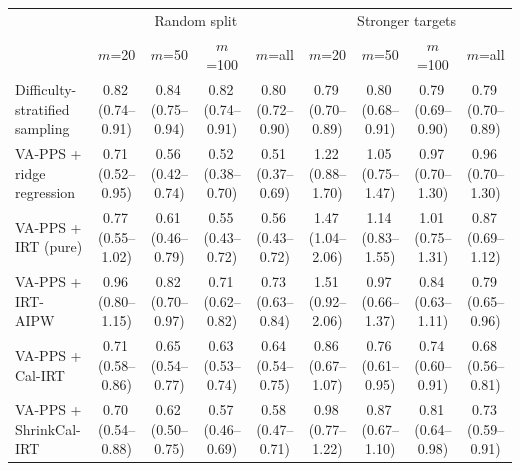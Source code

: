 \begin{tabular}{lcccccccc}
\toprule
 & \multicolumn{4}{c}{Random split} & \multicolumn{4}{c}{Stronger targets} \\
 & $m$=20 & $m$=50 & $m$=100 & $m$=all & $m$=20 & $m$=50 & $m$=100 & $m$=all \\
\midrule
Difficulty-stratified sampling & 0.82\,\scriptsize(0.74--0.91) & 0.84\,\scriptsize(0.75--0.94) & 0.82\,\scriptsize(0.74--0.91) & 0.80\,\scriptsize(0.72--0.90) & 0.79\,\scriptsize(0.70--0.89) & 0.80\,\scriptsize(0.68--0.91) & 0.79\,\scriptsize(0.69--0.90) & 0.79\,\scriptsize(0.70--0.89) \\
VA-PPS + ridge regression & 0.71\,\scriptsize(0.52--0.95) & 0.56\,\scriptsize(0.42--0.74) & 0.52\,\scriptsize(0.38--0.70) & 0.51\,\scriptsize(0.37--0.69) & 1.22\,\scriptsize(0.88--1.70) & 1.05\,\scriptsize(0.75--1.47) & 0.97\,\scriptsize(0.70--1.30) & 0.96\,\scriptsize(0.70--1.30) \\
VA-PPS + IRT (pure) & 0.77\,\scriptsize(0.55--1.02) & 0.61\,\scriptsize(0.46--0.79) & 0.55\,\scriptsize(0.43--0.72) & 0.56\,\scriptsize(0.43--0.72) & 1.47\,\scriptsize(1.04--2.06) & 1.14\,\scriptsize(0.83--1.55) & 1.01\,\scriptsize(0.75--1.31) & 0.87\,\scriptsize(0.69--1.12) \\
VA-PPS + IRT-AIPW & 0.96\,\scriptsize(0.80--1.15) & 0.82\,\scriptsize(0.70--0.97) & 0.71\,\scriptsize(0.62--0.82) & 0.73\,\scriptsize(0.63--0.84) & 1.51\,\scriptsize(0.92--2.06) & 0.97\,\scriptsize(0.66--1.37) & 0.84\,\scriptsize(0.63--1.11) & 0.79\,\scriptsize(0.65--0.96) \\
VA-PPS + Cal-IRT & 0.71\,\scriptsize(0.58--0.86) & 0.65\,\scriptsize(0.54--0.77) & 0.63\,\scriptsize(0.53--0.74) & 0.64\,\scriptsize(0.54--0.75) & 0.86\,\scriptsize(0.67--1.07) & 0.76\,\scriptsize(0.61--0.95) & 0.74\,\scriptsize(0.60--0.91) & 0.68\,\scriptsize(0.56--0.81) \\
VA-PPS + ShrinkCal-IRT & 0.70\,\scriptsize(0.54--0.88) & 0.62\,\scriptsize(0.50--0.75) & 0.57\,\scriptsize(0.46--0.69) & 0.58\,\scriptsize(0.47--0.71) & 0.98\,\scriptsize(0.77--1.22) & 0.87\,\scriptsize(0.67--1.10) & 0.81\,\scriptsize(0.64--0.98) & 0.73\,\scriptsize(0.59--0.91) \\
\bottomrule
\end{tabular}
